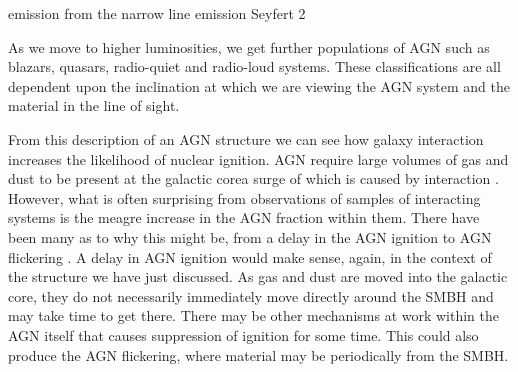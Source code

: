\DIFaddend emission from the \DIFdelbegin {}\DIFdelend \DIFaddbegin {}\DIFaddend narrow line emission \DIFdelbegin \DIFdel{(}\DIFdelend \DIFaddbegin {}\DIFaddend Seyfert 2 \DIFdelbegin {}\DIFdelend \DIFaddbegin {} \DIFdelbegin {}\DIFdelend \DIFaddbegin {}

\DIFaddend As we move to higher luminosities, we get further populations of AGN such as blazars, quasars, radio-quiet and radio-loud systems. These classifications are all dependent upon the inclination at which we are viewing the AGN system and the material in the line of sight.

From this description of an AGN structure we can see how galaxy interaction increases the likelihood of nuclear ignition. AGN require large volumes of gas and dust to be present at the galactic core\DIFdelbegin \DIFdel{; }\DIFdelend \DIFaddbegin \DIFadd{, }\DIFaddend a surge of which is caused by interaction \citep[][provides an excellent summary of this process from the point of view of simulations]{2008ApJS..175..356H}. However, what is often surprising from observations of samples of interacting systems is the meagre increase in the AGN fraction within them. There have been many \DIFdelbegin {}\DIFdelend \DIFaddbegin {}\DIFaddend as to why this might be, from a delay in the AGN ignition \citep{2011MNRAS.418.2043E} to AGN flickering \citep{2015MNRAS.451.2517S}. A delay in AGN ignition would make sense, again, in the context of the structure we have just discussed. As gas and dust are moved into the galactic core, they do not necessarily immediately move directly around the SMBH and may take time to get there. There may be other mechanisms at work within the AGN itself that causes suppression of ignition for some time. This could also produce the AGN flickering, where material may be periodically \DIFdelbegin {}\DIFdelend \DIFaddbegin {}\DIFaddend from the SMBH.

